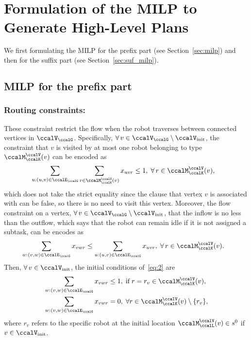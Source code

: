 \documentclass[Afour,sageh,times]{sagej}
\begin{document}
{\appendix
\section{Formulation of the MILP to Generate High-Level Plans}
We first formulating the MILP for the prefix part (see Section~\ref{sec:milp}) and then for the suffix part (see Section~\ref{sec:suf_milp}).
\subsection{MILP for the prefix part}\label{app:appendix_prefix_milp}
\subsubsection{Routing constraints:}\label{app:routing_constraints} These constraint restrict the flow when the robot traverses between connected vertices in $\ccalV_\ccalG$. Specifically, $\forall\, v \in \ccalV_\ccalG\setminus\ccalV_{\text{init}}$, the constraint that  $v$ is visited by at most one robot belonging to type $\ccalM^\ccalV_{\ccalK}(v)$ can be encoded as
\begingroup\makeatletter\def\f@size{10}\check@mathfonts
\def\maketag@@@#1{\hbox{\m@th\normalsize\normalfont#1}}%
\begin{align}
   & \sum_{u:(u,v)\in \ccalE_\ccalG} \sum_{r\in \ccalM^\ccalV_{\ccalK}(v)} x_{uvr}  \leq 1, \;\forall\, r \in \ccalM^\ccalV_{\ccalK}(v), \label{eq:1}
\end{align}
\endgroup
which does not take the strict equality since the clause that vertex $v$ is associated with can be false, so there is no need to visit this vertex. Moreover, the flow constraint on a vertex, $\forall \,v \in \ccalV_\ccalG\setminus\ccalV_{\text{init}}$, that the inflow is no less than the outflow, which says that the robot can remain idle if it is not assigned a subtask, can be encodes as
 \begingroup\makeatletter\def\f@size{10}\check@mathfonts
\def\maketag@@@#1{\hbox{\m@th\normalsize\normalfont#1}}%
\begin{align}
& \sum_{w:(v,w)\in \ccalE_\ccalG} x_{vwr}   \leq  \sum_{u:(u,v)\in \ccalE_\ccalG} x_{uvr}, \;\forall\, r \in \ccalM^\ccalV_{\ccalK}(v). \label{eq:2}
\end{align}
\endgroup
Then, $\forall \,v \in \ccalV_{\text{init}}$, the initial conditions of~\eqref{eq:2} are
\begingroup\makeatletter\def\f@size{10}\check@mathfonts
\def\maketag@@@#1{\hbox{\m@th\normalsize\normalfont#1}}%
\begin{subequations}\label{eq:2.5}
  \begin{align}
    & \sum_{w:(v,w)\in \ccalE_\ccalG} x_{vwr}  \leq 1, \;\text{if}\; r = r_v \in \ccalM^\ccalV_{\ccalK}(v), \label{eq:2.5a}\\
    & \sum_{w:(v,w)\in \ccalE_\ccalG} x_{vwr}  = 0, \;\forall r \in \ccalM^\ccalV_{\ccalK}(v)\setminus \{ r_v\}, \label{eq:2.5b}
  \end{align}
\end{subequations}
\endgroup
where $r_v$ refers to the specific robot at the initial location $\ccalM^\ccalV_{\ccalL}(v)\in s^0$ if $v \in \ccalV_{\text{init}}$.
}
\end{document}
